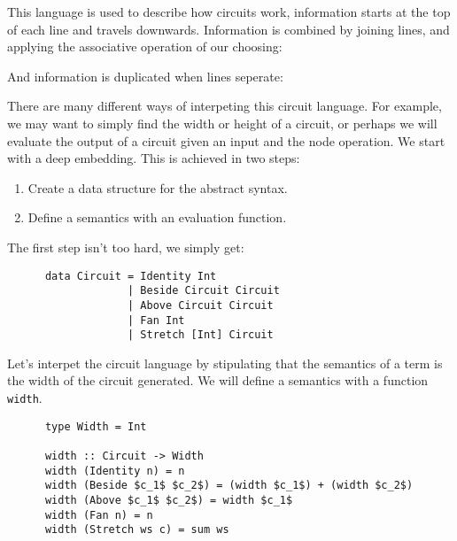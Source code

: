 \documentclass[a4paper,12pt]{article}
\theoremstyle{remark}
\begin{document}
  This language is used to describe how circuits work, information starts at the
  top of each line and travels downwards. Information is combined by joining lines,
  and applying the associative operation of our choosing:

  \begin{figure}[H]
    \centering
  \end{figure}

  And information is duplicated when lines seperate:

  \begin{figure}[H]
    \centering
  \end{figure}

  There are many different ways of interpeting this circuit language. For example,
  we may want to simply find the width or height of a circuit, or perhaps we will
  evaluate the output of a circuit given an input and the node operation. We start
  with a deep embedding. This is achieved in two steps:
  \begin{enumerate}
    \item Create a data structure for the abstract syntax.
    \item Define a semantics with an evaluation function.
  \end{enumerate}

  The first step isn't too hard, we simply get:

  \begin{lstlisting}
      data Circuit = Identity Int
                   | Beside Circuit Circuit
                   | Above Circuit Circuit
                   | Fan Int
                   | Stretch [Int] Circuit  \end{lstlisting}

  Let's interpet the circuit language by stipulating that the semantics of a term is
  the width of the circuit generated. We will define a semantics with a function \lstinline{width}.

  \begin{lstlisting}
      type Width = Int

      width :: Circuit -> Width
      width (Identity n) = n
      width (Beside $c_1$ $c_2$) = (width $c_1$) + (width $c_2$)
      width (Above $c_1$ $c_2$) = width $c_1$
      width (Fan n) = n
      width (Stretch ws c) = sum ws  \end{lstlisting}
\end{document}
